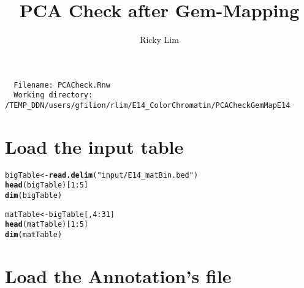 \documentclass{article}\usepackage{graphicx, color}
\makeatletter
\newcommand{\hlfunctioncall}[1]{\textcolor[rgb]{0.501960784313725,0,0.329411764705882}{\textbf{#1}}}%
\newcommand{\hlstring}[1]{\textcolor[rgb]{0.6,0.6,1}{#1}}%
\newenvironment{kframe}{%
 \def\at@end@of@kframe{}%
 \ifinner\ifhmode%
  \def\at@end@of@kframe{\end{minipage}}%
  \begin{minipage}{\columnwidth}%
 \fi\fi%
 \def\FrameCommand##1{\hskip\@totalleftmargin \hskip-\fboxsep
 \colorbox{shadecolor}{##1}\hskip-\fboxsep
     \hskip-\linewidth \hskip-\@totalleftmargin \hskip\columnwidth}%
 \MakeFramed {\advance\hsize-\width
   \@totalleftmargin\z@ \linewidth\hsize
   \@setminipage}}%
 {\par\unskip\endMakeFramed%
 \at@end@of@kframe}
\newenvironment{knitrout}{}{} %
\makeatother
\begin{document}
\author{Ricky Lim}
\title{PCA Check after Gem-Mapping}
\maketitle

\begin{verbatim}
  Filename: PCACheck.Rnw 
  Working directory: /TEMP_DDN/users/gfilion/rlim/E14_ColorChromatin/PCACheckGemMapE14 
\end{verbatim}

\section{Load the input table}

\begin{knitrout}
\color{fgcolor}\begin{kframe}
\begin{alltt}
bigTable <- \hlfunctioncall{read.delim}(\hlstring{"input/E14_matBin.bed"})
\hlfunctioncall{head}(bigTable)[1:5]
\hlfunctioncall{dim}(bigTable)

matTable <- bigTable[, 4:31]
\hlfunctioncall{head}(matTable)[1:5]
\hlfunctioncall{dim}(matTable)
\end{alltt}
\end{kframe}
\end{knitrout}


\section{Load the Annotation's file}
\end{document}
